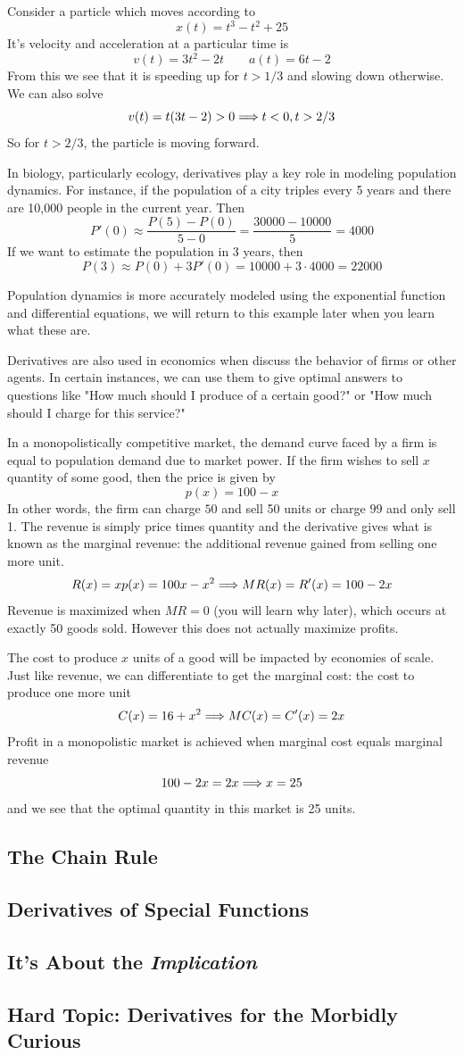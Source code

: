 \begin{example}
	Consider a particle which moves according to
	\[ x(t) = t^3 - t^2 + 25 \]
	It's velocity and acceleration at a particular time is 
	\[ v(t) = 3t^2 - 2t \qquad a(t) = 6t - 2 \]
	From this we see that it is speeding up for $t > 1/3$ and slowing down otherwise. We can also solve
	\[ v(t) = t(3t - 2) > 0 \Longrightarrow t < 0, t > 2/3 \]
	So for $t > 2/3$, the particle is moving forward.
\end{example}

In biology, particularly ecology, derivatives play a key role in modeling population dynamics. For instance, if the population of a city triples every 5 years and there are 10,000 people in the current year. Then
\[ P'(0) \approx \frac{P(5) - P(0)}{5 - 0} = \frac{30000 - 10000}{5} = 4000 \]
If we want to estimate the population in 3 years, then
\[ P(3) \approx P(0) + 3P'(0) = 10000 + 3 \cdot 4000 = 22000 \]

Population dynamics is more accurately modeled using the exponential function and differential equations, we will return to this example later when you learn what these are.

Derivatives are also used in economics when discuss the behavior of firms or other agents. In certain instances, we can use them to give optimal answers to questions like "How much should I produce of a certain good?" or "How much should I charge for this service?" 

\begin{example}
	In a monopolistically competitive market, the demand curve faced by a firm is equal to population demand due to market power. If the firm wishes to sell $x$ quantity of some good, then the price is given by
	\[ p(x) = 100 - x \]
	In other words, the firm can charge $50$ and sell 50 units or charge $99$ and only sell 1. The revenue is simply price times quantity and the derivative gives what is known as the marginal revenue: the additional revenue gained from selling one more unit.
	\[ R(x) = x p(x) = 100 x - x^2 \Longrightarrow MR(x) = R'(x) = 100 - 2x \]
	Revenue is maximized when $MR = 0$ (you will learn why later), which occurs at exactly 50 goods sold. However this does not actually maximize profits.
	
	The cost to produce $x$ units of a good will be impacted by economies of scale. Just like revenue, we can differentiate to get the marginal cost: the cost to produce one more unit
	\[ C(x) = 16 + x^2 \Longrightarrow MC(x) = C'(x) = 2x \]
	Profit in a monopolistic market is achieved when marginal cost equals marginal revenue
	\[ 100 - 2x = 2x \Longrightarrow x = 25 \]
	and we see that the optimal quantity in this market is 25 units.
\end{example}
\newpage

\subsection{The Chain Rule}
\subsection{Derivatives of Special Functions}
\subsection{It's About the \emph{Implication}}
\subsection{Hard Topic: Derivatives for the Morbidly Curious}